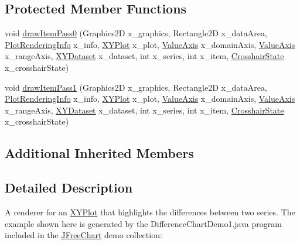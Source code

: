 \subsection*{Protected Member Functions}
\begin{DoxyCompactItemize}
\item 
void \mbox{\hyperlink{classorg_1_1jfree_1_1chart_1_1renderer_1_1xy_1_1_x_y_difference_renderer_adc855c55f962a468d7b18740e7d80419}{draw\+Item\+Pass0}} (Graphics2D x\+\_\+graphics, Rectangle2D x\+\_\+data\+Area, \mbox{\hyperlink{classorg_1_1jfree_1_1chart_1_1plot_1_1_plot_rendering_info}{Plot\+Rendering\+Info}} x\+\_\+info, \mbox{\hyperlink{classorg_1_1jfree_1_1chart_1_1plot_1_1_x_y_plot}{X\+Y\+Plot}} x\+\_\+plot, \mbox{\hyperlink{classorg_1_1jfree_1_1chart_1_1axis_1_1_value_axis}{Value\+Axis}} x\+\_\+domain\+Axis, \mbox{\hyperlink{classorg_1_1jfree_1_1chart_1_1axis_1_1_value_axis}{Value\+Axis}} x\+\_\+range\+Axis, \mbox{\hyperlink{interfaceorg_1_1jfree_1_1data_1_1xy_1_1_x_y_dataset}{X\+Y\+Dataset}} x\+\_\+dataset, int x\+\_\+series, int x\+\_\+item, \mbox{\hyperlink{classorg_1_1jfree_1_1chart_1_1plot_1_1_crosshair_state}{Crosshair\+State}} x\+\_\+crosshair\+State)
\item 
void \mbox{\hyperlink{classorg_1_1jfree_1_1chart_1_1renderer_1_1xy_1_1_x_y_difference_renderer_a7cfba2146aab97ceb88c57c865d374c5}{draw\+Item\+Pass1}} (Graphics2D x\+\_\+graphics, Rectangle2D x\+\_\+data\+Area, \mbox{\hyperlink{classorg_1_1jfree_1_1chart_1_1plot_1_1_plot_rendering_info}{Plot\+Rendering\+Info}} x\+\_\+info, \mbox{\hyperlink{classorg_1_1jfree_1_1chart_1_1plot_1_1_x_y_plot}{X\+Y\+Plot}} x\+\_\+plot, \mbox{\hyperlink{classorg_1_1jfree_1_1chart_1_1axis_1_1_value_axis}{Value\+Axis}} x\+\_\+domain\+Axis, \mbox{\hyperlink{classorg_1_1jfree_1_1chart_1_1axis_1_1_value_axis}{Value\+Axis}} x\+\_\+range\+Axis, \mbox{\hyperlink{interfaceorg_1_1jfree_1_1data_1_1xy_1_1_x_y_dataset}{X\+Y\+Dataset}} x\+\_\+dataset, int x\+\_\+series, int x\+\_\+item, \mbox{\hyperlink{classorg_1_1jfree_1_1chart_1_1plot_1_1_crosshair_state}{Crosshair\+State}} x\+\_\+crosshair\+State)
\end{DoxyCompactItemize}
\subsection*{Additional Inherited Members}


\subsection{Detailed Description}
A renderer for an \mbox{\hyperlink{}{X\+Y\+Plot}} that highlights the differences between two series. The example shown here is generated by the {\ttfamily Difference\+Chart\+Demo1.\+java} program included in the \mbox{\hyperlink{classorg_1_1jfree_1_1chart_1_1_j_free_chart}{J\+Free\+Chart}} demo collection\+: ~\newline
~\newline
  


